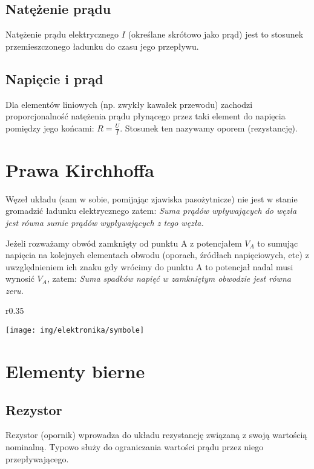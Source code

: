 \documentclass{pdfBooklets}
\begin{document}
\subsection{Natężenie prądu}
    Natężenie prądu elektrycznego $I$ (określane skrótowo jako prąd)
    jest to stosunek przemieszczonego ładunku do czasu jego przepływu.

\subsection{Napięcie i prąd}
Dla elementów liniowych (np. zwykły kawałek przewodu) zachodzi proporcjonalność natężenia prądu płynącego przez taki element do napięcia pomiędzy jego końcami: $R=\frac{U}{I}$. Stosunek ten nazywamy oporem (rezystancję).

\section{Prawa Kirchhoffa}
Węzeł układu (sam w sobie, pomijając zjawiska pasożytnicze) nie jest w stanie gromadzić ładunku elektrycznego zatem: \emph{Suma prądów wpływających do węzła jest równa sumie prądów wypływających z tego węzła.}

Jeżeli rozważamy obwód zamknięty od punktu A z potencjałem $V_A$ to sumując napięcia na kolejnych elementach obwodu (oporach, źródłach napięciowych, etc) z uwzględnieniem ich znaku gdy wrócimy do punktu A to potencjał nadal musi wynosić $V_A$, zatem: \emph{Suma spadków napięć w zamkniętym obwodzie jest równa zeru.}


\begin{wrapfigure}{r}{0.35\textwidth}
  \begin{center}
    \vspace{-40pt}
    \texttt{[image: img/elektronika/symbole]}
    \vspace{-20pt}
  \end{center}
\end{wrapfigure}
\section{Elementy bierne}

\subsection{Rezystor}
Rezystor (opornik) wprowadza do układu rezystancję związaną z swoją wartością nominalną. Typowo służy do ograniczania wartości prądu przez niego przepływającego.
\end{document}
